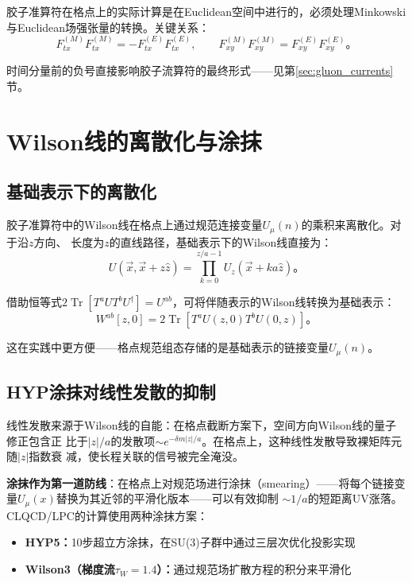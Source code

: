 \documentclass[12pt,a4paper]{ctexart}
\theoremstyle{definition}
\begin{document}
胶子准算符在格点上的实际计算是在Euclidean空间中进行的，必须处理Minkowski与Euclidean场强张量的转换。关键关系\cite{NoteGluonPDFs}：
\begin{equation}
F^{(M)}_{tx}F^{(M)}_{tx} = -F^{(E)}_{tx}F^{(E)}_{tx}, \qquad
F^{(M)}_{xy}F^{(M)}_{xy} = F^{(E)}_{xy}F^{(E)}_{xy}。
\label{eq:mink_eucl_convert}
\end{equation}

时间分量前的负号直接影响胶子流算符的最终形式——见第\ref{sec:gluon_currents}节。

\section{Wilson线的离散化与涂抹}

\subsection{基础表示下的离散化}

胶子准算符中的Wilson线在格点上通过规范连接变量$U_\mu(n)$的乘积来离散化。对于沿$z$方向、
长度为$z$的直线路径，基础表示下的Wilson线直接为\cite{NoteGluonPDFs}：
\begin{equation}
U(\vec{x}, \vec{x}+z\hat{z}) = \prod_{k=0}^{z/a-1} U_z(\vec{x}+k a\hat{z})。
\end{equation}

借助恒等式$2\operatorname{Tr}[T^a U T^b U^\dagger]=U^{ab}$，可将伴随表示的Wilson线转换为基础表示：
\begin{equation}
W^{ab}[z,0] = 2\operatorname{Tr}[T^a U(z,0) T^b U(0,z)]。
\end{equation}

这在实践中更方便——格点规范组态存储的是基础表示的链接变量$U_\mu(n)$。

\subsection{HYP涂抹对线性发散的抑制}

线性发散来源于Wilson线的自能：在格点截断方案下，空间方向Wilson线的量子修正包含正
比于$|z|/a$的发散项$\sim e^{-\delta m|z|/a}$。在格点上，这种线性发散导致裸矩阵元随$|z|$指数衰
减，使长程关联的信号被完全淹没。

\textbf{涂抹作为第一道防线}\cite{Chen2025gluon,NoteGluonPDFs,本库补充4}：在格点上对规范场进行涂抹（smearing）——将每个链接变量$U_\mu(x)$替换为其近邻的平滑化版本——可以有效抑制
$\sim 1/a$的短距离UV涨落。
CLQCD/LPC的计算使用两种涂抹方案：
\begin{itemize}
    \item \textbf{HYP5：}10步超立方涂抹，在SU(3)子群中通过三层次优化投影实现
    \item \textbf{Wilson3（梯度流$\tau_W=1.4$）：}通过规范场扩散方程的积分来平滑化
\end{itemize}
\end{document}
